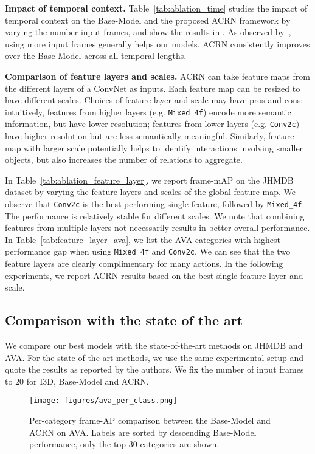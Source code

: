 \documentclass[runningheads]{llncs}
\newcommand{\mixed}[1]{\texttt{Mixed\_#1}}
\begin{document}
\medskip\noindent\textbf{Impact of temporal context.}
Table~\ref{tab:ablation_time} studies the impact of temporal context on the Base-Model and the proposed ACRN framework by varying the number input frames, and show the results in . As observed by~\cite{ava_cvpr18}, using more input frames generally helps our models. ACRN consistently improves over the Base-Model across all temporal lengths.

\medskip\noindent\textbf{Comparison of feature layers and scales.} ACRN can take feature maps from the different layers of a ConvNet as inputs. Each feature map can be resized to have different scales. Choices of feature layer and scale may have pros and cons: intuitively, features from higher layers (e.g. \mixed{4f}) encode more semantic information, but have lower resolution; features from lower layers (e.g. \texttt{Conv2c}) have higher resolution but are less semantically meaningful. Similarly, feature map with larger scale potentially helps to identify interactions involving smaller objects, but also increases the number of relations to aggregate.

In Table~\ref{tab:ablation_feature_layer}, we report frame-mAP on the JHMDB dataset by varying the feature layers and scales of the global feature map. We observe that \texttt{Conv2c} is the best performing single feature, followed by \mixed{4f}. The performance is relatively stable for different scales. We note that combining features from multiple layers not necessarily results in better overall performance. In Table~\ref{tab:feature_layer_ava}, we list the AVA categories with highest performance gap when using \mixed{4f} and \texttt{Conv2c}. We can see that the two feature layers are clearly complimentary for many actions. In the following experiments, we report ACRN results based on the best single feature layer and scale.


\subsection{Comparison with the state of the art}
We compare our best models with the state-of-the-art methods on JHMDB and AVA. For the state-of-the-art methods, we use the same experimental setup and quote the results as reported by the authors. We fix the number of input frames to 20 for I3D, Base-Model and ACRN.


\begin{figure}[t]
    \centering
    \texttt{[image: figures/ava\_per\_class.png]}
    \caption{Per-category frame-AP comparison between the Base-Model and ACRN on AVA. Labels are sorted by descending Base-Model performance, only the top 30 categories are shown.}
    \label{fig:ava2_ap}
\end{figure}
\end{document}
